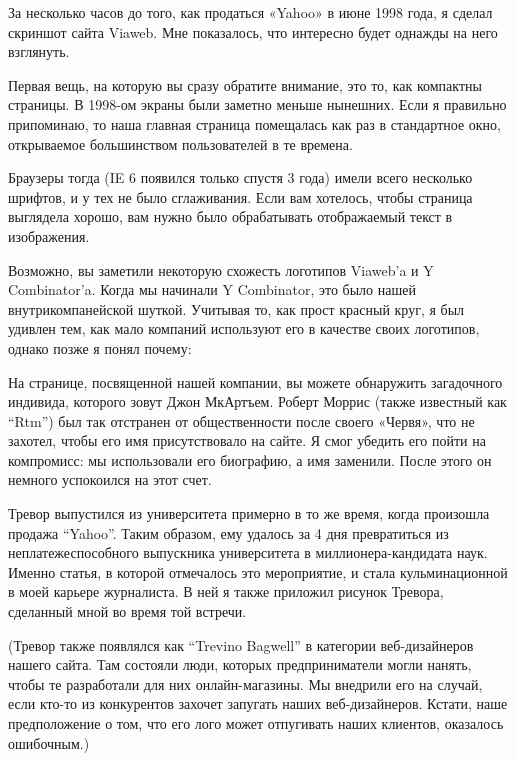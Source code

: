\documentclass[ebook,12pt,oneside,openany]{memoir}
\author{Пол Грэм} \date{}
\begin{document}
\maketitle

За несколько часов до того, как продаться «Yahoo» в июне 1998 года, я
сделал скриншот сайта Viaweb. Мне показалось, что интересно будет
однажды на него взглянуть. \newline

Первая вещь, на которую вы сразу обратите внимание, это то, как
компактны страницы. В 1998-ом экраны были заметно меньше нынешних.
Если я правильно припоминаю, то наша главная страница помещалась как
раз в стандартное окно, открываемое большинством пользователей в те
времена. \newline

Браузеры тогда (IE 6 появился только спустя 3 года) имели всего
несколько шрифтов, и у тех не было сглаживания. Если вам хотелось,
чтобы страница выглядела хорошо, вам нужно было обрабатывать
отображаемый текст в изображения. \newline

Возможно, вы заметили некоторую схожесть логотипов Viaweb’a и Y
Combinator’a. Когда мы начинали Y Combinator, это было нашей
внутрикомпанейской шуткой. Учитывая то, как прост красный круг, я был
удивлен тем, как мало компаний используют его в качестве своих
логотипов, однако позже я понял почему: \newline

На странице, посвященной нашей компании, вы можете обнаружить
загадочного индивида, которого зовут Джон МкАртъем. Роберт Моррис
(также известный как “Rtm”) был так отстранен от общественности после
своего «Червя», что не захотел, чтобы его имя присутствовало на сайте.
Я смог убедить его пойти на компромисс: мы использовали его биографию,
а имя заменили. После этого он немного успокоился на этот счет. \newline

Тревор выпустился из университета примерно в то же время, когда
произошла продажа “Yahoo”. Таким образом, ему удалось за 4 дня
превратиться из неплатежеспособного выпускника университета в
миллионера-кандидата наук. Именно статья, в которой отмечалось это
мероприятие, и стала кульминационной в моей карьере журналиста. В ней
я также приложил рисунок Тревора, сделанный мной во время той встречи. \newline

(Тревор также появлялся как “Trevino Bagwell” в категории
веб-дизайнеров нашего сайта. Там состояли люди, которых
предприниматели могли нанять, чтобы те разработали для них
онлайн-магазины. Мы внедрили его на случай, если кто-то из конкурентов
захочет запугать наших веб-дизайнеров. Кстати, наше предположение о
том, что его лого может отпугивать наших клиентов, оказалось
ошибочным.) \newline
\end{document}
